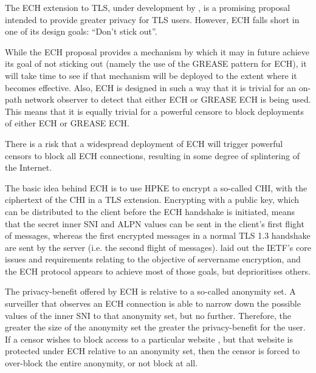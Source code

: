 The \ac{ECH} extension to \ac{TLS}, under development
by \cite{esni},
is a promising proposal
intended to provide greater privacy for \ac{TLS} users.
However, \ac{ECH} falls short in one of its
design goals: ``Don't stick out''.

While the \ac{ECH} proposal provides a mechanism
by which it may in future achieve its goal
of not sticking out (namely the use of the \ac{GREASE} pattern for \ac{ECH}),
it will take time to see if that mechanism
will be deployed to the extent where it becomes effective.
Also, \ac{ECH} is designed in such a way that it
is trivial for an on-path network observer to
detect that either \ac{ECH} or \ac{GREASE} \ac{ECH}
is being used.
This means that it is equally trivial for a powerful
censore to block deployments of either \ac{ECH} or \ac{GREASE} \ac{ECH}.

There is a risk that a widespread deployment of \ac{ECH} will trigger powerful censors to block
all \ac{ECH} connections, resulting in some
degree of splintering of the Internet.


The basic idea behind \ac{ECH} is to use \ac{HPKE} to encrypt a so-called \ac{CHI},
with the ciphertext of the \ac{CHI} in a \ac{TLS} extension.
Encrypting with a public key, which can be distributed to the client before the \ac{ECH} handshake is initiated,
means that the secret inner \ac{SNI} and \ac{ALPN} values can be sent in the client's
first flight of messages, whereas the first encrypted messages in a normal \ac{TLS} 1.3 handshake
are sent by the server (i.e. the second flight of messages).
\cite{rfc8744-issues} laid out the \ac{IETF}'s core issues and requirements relating to the
objective of servername encryption,
and the \ac{ECH} protocol appears to achieve most of those goals,
but deprioritises others.

The privacy-benefit offered by \ac{ECH} is relative to a so-called anonymity set.
A surveiller that observes an \ac{ECH} connection is able to narrow down the possible
values of the inner \ac{SNI} to that anonymity set, but no further.
Therefore, the greater the size of the anonymity set
the greater the privacy-benefit for the user.
If a censor wishes to block access to a particular website ,
but that website is protected under \ac{ECH} relative to an anonymity set,
then the censor is forced to over-block the entire anonymity,
or not block  at all.

